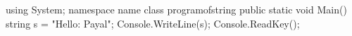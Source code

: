 
using System;
namespace name
{
    class programofstring
    {
        public static void Main()
        {
            string s = "Hello: Payal";
            Console.WriteLine(s);
            Console.ReadKey();
        }
}
    }



